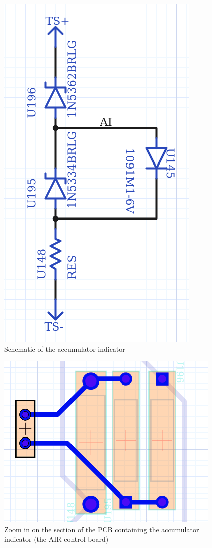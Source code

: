 \documentclass{article}
\begin{document}
        \begin{figure}[H]
            \centering
            \includegraphics[width = 0.8 \textwidth]{aischem}
            \caption{Schematic of the accumulator indicator}
            \label{aischem}
        \end{figure}

        \begin{figure}[H]
            \centering
            \includegraphics[width = 0.3 \textwidth]{accuindicator}
            \caption{Zoom in on the section of the PCB containing the accumulator indicator (the AIR control board)}
            \label{aindicatorPCB}
        \end{figure}
\end{document}
